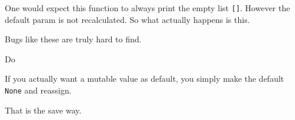 \begin{frame}[fragile]

One would expect this function to always print the empty list
\texttt{{[}{]}}. However the default param is not recalculated. So what
actually happens is this.

\begin{Shaded}
\begin{Highlighting}[]
\NormalTok{)  }\CommentTok{# ==> []}
\NormalTok{)  }\CommentTok{# ==> [1]}
\NormalTok{) }\CommentTok{# ==> [1,2]}
\end{Highlighting}
\end{Shaded}

Bugs like these are truly hard to find.

\end{frame}

\begin{frame}[fragile]

\begin{block}{Do}

If you actually want a mutable value as default, you simply make the
default \texttt{None} and reassign.

\begin{Shaded}
\begin{Highlighting}[]
 \OperatorTok{=}\NormalTok{):}
    \OperatorTok{=} \NormalTok{[] }    
\end{Highlighting}
\end{Shaded}

That is the save way.

\end{block}

\end{frame}

